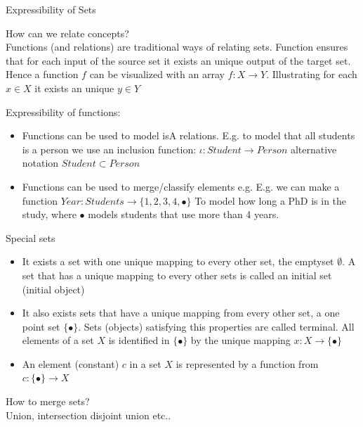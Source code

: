 \documentclass[slidetop,mathserif,red]{beamer}
\begin{document}
\begin{frame}{Expressibility of Sets}

How can we relate concepts?\\
Functions (and relations) are traditional ways of relating sets.
Function ensures that for each input of the source set it exists an unique output of the target set. Hence a function $f$ can be visualized with an array $f: X \to Y$. Illustrating for each $x \in X$ it exists an unique $y \in Y$ 

Expressibility of functions:
\begin{itemize}
\item Functions can be used to model isA relations. E.g. to model that all students is a person we use an inclusion function: $\iota: Student \to Person$
alternative notation $Student \subset Person$

\item Functions can be used to merge/classify elements
e.g.  E.g. we can make a function $Year: Students \to \{ 1,2,3, 4,  \bullet \}$ To model how long  a PhD is in the study, where $\bullet$ models students that use more than 4 years. 
\end{itemize}
\end{frame}



\begin{frame}{Special sets}
\begin{itemize}
\item It exists a set with one unique mapping to every other set, the emptyset $\emptyset$. A set that has a unique mapping to every other sets is called an initial set (initial object)

\item It also exists sets that have a unique mapping from every other set, a one point set $\{ \bullet \}$.
Sets (objects) satisfying this properties are called terminal.
All elements of a set $X$ is identified in $\{ \bullet \}$ by the unique mapping $x:X \to \{ \bullet \}$

\item An element (constant) $c$ in a set $X$ is represented by a function from $c: \{ \bullet \} \to X$
\end{itemize}


How to merge sets?\\
Union, intersection disjoint union etc..
\end{frame}
\end{document}
